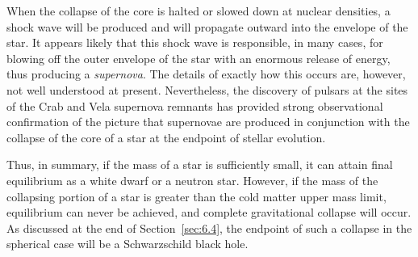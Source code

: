 When the collapse of the core is halted or slowed down at nuclear densities, a
shock wave will be produced and will propagate outward into the envelope of the
star. It appears likely that this shock wave is responsible, in many cases, for
blowing off the outer envelope of the star with an enormous release of energy, thus
producing a \emph{supernova}. The details of exactly how this occurs are, however,
not well understood at present. Nevertheless, the discovery of pulsars at the
sites of the Crab and Vela supernova remnants has provided strong observational
confirmation of the picture that supernovae are produced in conjunction with the
collapse of the core of a star at the endpoint of stellar evolution.

Thus, in summary, if the mass of a star is sufficiently small, it can attain final
equilibrium as a white dwarf or a neutron star. However, if the mass of the
collapsing portion of a star is greater than the cold matter upper mass limit,
equilibrium can never be achieved, and complete gravitational collapse will occur.
As discussed at the end of Section~\ref{sec:6.4}, the endpoint of such a collapse
in the spherical case will be a Schwarzschild black hole.
